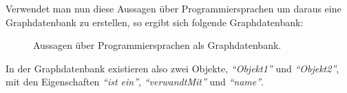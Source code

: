 Verwendet man nun diese Aussagen über Programmiersprachen um daraus eine Graphdatenbank zu erstellen, so ergibt sich folgende Graphdatenbank:
\begin{figure}[htbp]
\centering {}
\caption{Aussagen über Programmiersprachen als Graphdatenbank.\label{fig:programmiersprachen_graphdatenbank}\protect\footnotemark}
\end{figure}

In der Graphdatenbank existieren also zwei Objekte, \textit{``Objekt1''} und \textit{``Objekt2''}, mit den Eigenschaften \textit{``ist ein''}, \textit{``verwandtMit''} und \textit{``name''}.

